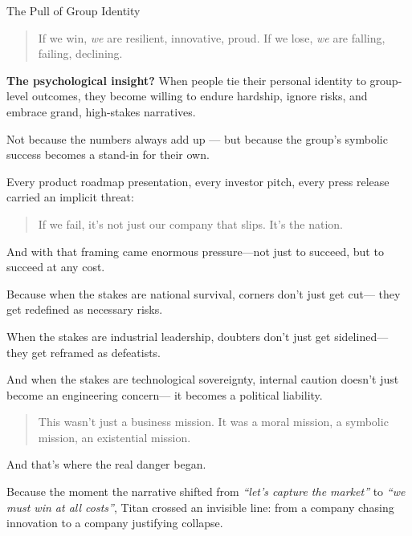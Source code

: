 \begin{PsychologicalSidebar}{The Pull of Group Identity}
    \begin{quote}
    If we win, \textit{we} are resilient, innovative, proud.  
    If we lose, \textit{we} are falling, failing, declining.
    \end{quote}
    
    \textbf{The psychological insight?}  When people tie their personal identity to group-level outcomes, they become willing to endure hardship, ignore risks, and embrace grand, high-stakes narratives.

    \medskip
    
    Not because the numbers always add up — but because the group’s symbolic success becomes a stand-in for their own.
    
\end{PsychologicalSidebar}

\medskip

Every product roadmap presentation, every investor pitch, every press release carried an implicit threat:

\begin{quote}
If we fail,
it’s not just our company that slips.
It’s the nation.
\end{quote}

And with that framing came enormous pressure—not just to succeed,
but to succeed at any cost.

Because when the stakes are national survival,
corners don’t just get cut—
they get redefined as necessary risks.

When the stakes are industrial leadership,
doubters don’t just get sidelined—
they get reframed as defeatists.

And when the stakes are technological sovereignty,
internal caution doesn’t just become an engineering concern—
it becomes a political liability.

\begin{quote}
    This wasn’t just a business mission.
    It was a moral mission,
    a symbolic mission,
    an existential mission.
\end{quote}
    
And that’s where the real danger began.

Because the moment the narrative shifted from
\textit{“let’s capture the market”}
to
\textit{“we must win at all costs”},
Titan crossed an invisible line:
from a company chasing innovation
to a company justifying collapse.

\medskip

